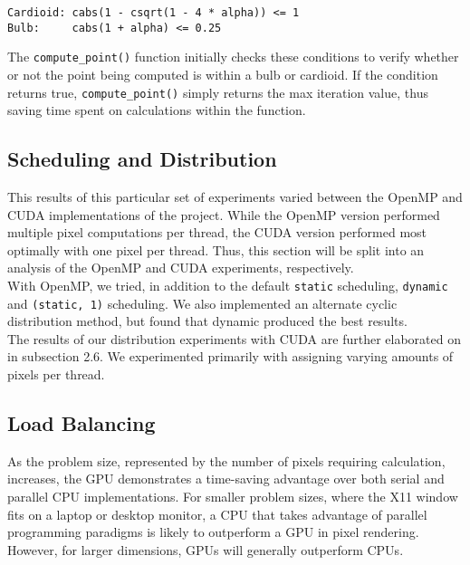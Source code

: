 \documentclass{article}
\begin{document}
\begin{verbatim}
Cardioid: cabs(1 - csqrt(1 - 4 * alpha)) <= 1
Bulb:     cabs(1 + alpha) <= 0.25
\end{verbatim}

The \verb|compute_point()| function initially checks these conditions to verify whether or not the point being computed is within a bulb or cardioid.
If the condition returns true, \verb|compute_point()| simply returns the max iteration value, thus saving time spent on calculations within the function.

\subsection{Scheduling and Distribution}

This results of this particular set of experiments varied between the OpenMP and CUDA implementations of the project.
While the OpenMP version performed multiple pixel computations per thread, the CUDA version performed most optimally with one pixel per thread.
Thus, this section will be split into an analysis of the OpenMP and CUDA experiments, respectively.\\

With OpenMP, we tried, in addition to the default \verb|static| scheduling,  \verb|dynamic| and \verb|(static, 1)| scheduling.
We also implemented an alternate cyclic distribution method, but found that dynamic produced the best results.\\

The results of our distribution experiments with CUDA are further elaborated on in subsection 2.6.
We experimented primarily with assigning varying amounts of pixels per thread.

\subsection{Load Balancing}

As the problem size, represented by the number of pixels requiring calculation, increases, the GPU demonstrates a time-saving advantage over both serial and parallel CPU implementations.
For smaller problem sizes, where the X11 window fits on a laptop or desktop monitor, a CPU that takes advantage of parallel programming paradigms is likely to outperform a GPU in pixel rendering.
However, for larger dimensions, GPUs will generally outperform CPUs.\\
\end{document}
